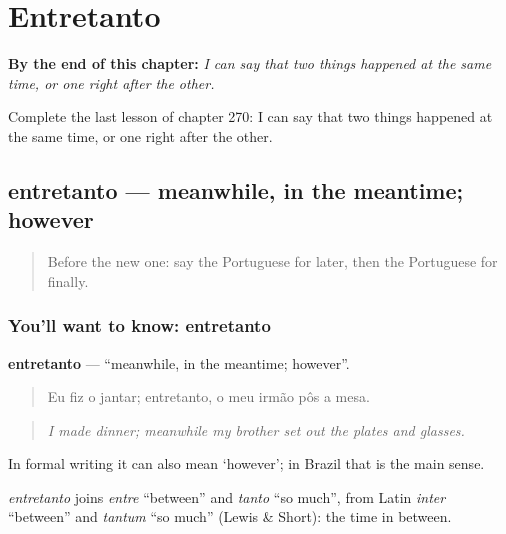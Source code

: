
\chapter{Entretanto}
\label{ch:pt-entretanto}

\begin{chapteropening}
\textbf{By the end of this chapter:} \emph{I can say that two things happened at the same time, or one right after the other.}

Complete the last lesson of chapter 270: I can say that two things happened at the same time, or one right after the other.
\end{chapteropening}

\section[entretanto]{entretanto — meanwhile, in the meantime; however}

\label{lesson:PT-C270-entretanto}



\begin{quote}
Before the new one: say the Portuguese for later, then the Portuguese for finally.
\end{quote}

\subsection*{You'll want to know: entretanto}
\textbf{entretanto} — \textquotedblleft{}meanwhile, in the meantime; however\textquotedblright{}.

\begin{quote}
Eu fiz o jantar; entretanto, o meu irmão pôs a mesa.
\end{quote}

\begin{quote}
\emph{I made dinner; meanwhile my brother set out the plates and glasses.}
\end{quote}

In formal writing it can also mean ‘however’; in Brazil that is the main sense.

\begin{cousinweb}
\emph{entretanto} joins \emph{entre} \textquotedblleft{}between\textquotedblright{} and \emph{tanto} \textquotedblleft{}so much\textquotedblright{}, from Latin \emph{inter} \textquotedblleft{}between\textquotedblright{} and \emph{tantum} \textquotedblleft{}so much\textquotedblright{} (Lewis \& Short): the time in between.
\end{cousinweb}

